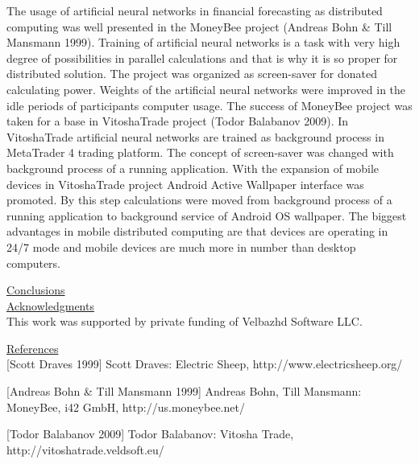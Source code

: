 \documentclass{article}
\begin{document}
The usage of artificial neural networks in financial forecasting as distributed computing was well presented in the MoneyBee project (Andreas Bohn \& Till Mansmann 1999). Training of artificial neural networks is a task with very high degree of possibilities in parallel calculations and that is why it is so proper for distributed solution. The project was organized as screen-saver for donated calculating power. Weights of the artificial neural networks were improved in the idle periods of participants computer usage. The success of MoneyBee project was taken for a base in VitoshaTrade project (Todor Balabanov 2009). In VitoshaTrade artificial neural networks are trained as background process in MetaTrader 4 trading platform. The concept of screen-saver was changed with background process of a running application. With the expansion of mobile devices in VitoshaTrade project Android Active Wallpaper interface was promoted. By this step calculations were moved from background process of a running application to background service of Android OS wallpaper. The biggest advantages in mobile distributed computing are that devices are operating in 24/7 mode and mobile devices are much more in number than desktop computers.

\vspace*{3mm}
\underline{Conclusions} \\

\vspace*{3mm}
\underline{Acknowledgments} \\

This work was supported by private funding of Velbazhd Software LLC.

\vspace*{3mm}
\underline{References} \\

[Scott Draves 1999] Scott Draves: Electric Sheep, http://www.electricsheep.org/

[Andreas Bohn \& Till Mansmann 1999] Andreas Bohn, Till Mansmann: MoneyBee, i42 GmbH, http://us.moneybee.net/

[Todor Balabanov 2009] Todor Balabanov: Vitosha Trade, http://vitoshatrade.veldsoft.eu/
\end{document}
